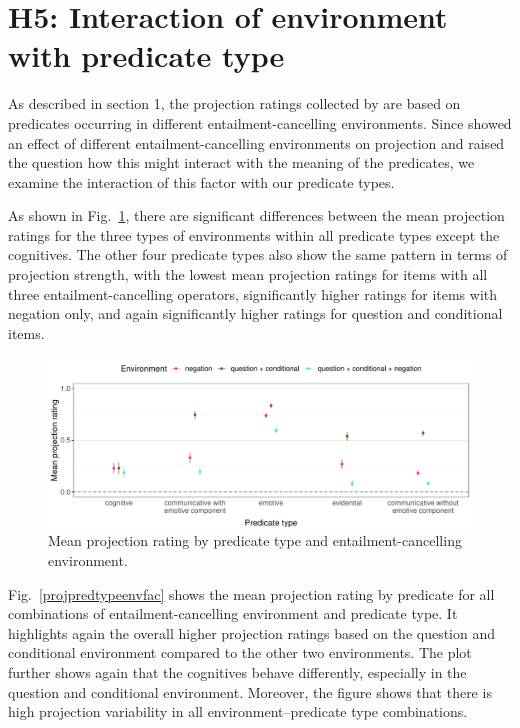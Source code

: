\documentclass[11pt,fleqn]{article}
\newcommand{\figref}[1]{Fig.~\ref{#1}}
\newcommand{\6}{\mbox{$[\hspace*{-.6mm}[$}}
\newcommand{\9}{\mbox{$]\hspace*{-.6mm}]$}}
\begin{document}
\section{H5: Interaction of environment with predicate type}

As described in section 1, the projection ratings collected by \cite{white-rawlins-nels2018} are based on predicates occurring in different entailment-cancelling environments. Since \cite{hofmann-etal23} showed an effect of different entailment-cancelling environments on projection and raised the question how this might interact with the meaning of the predicates, we examine the interaction of this factor with our predicate types. 

As shown in \figref{projpredtypeenv}, there are significant differences between the mean projection ratings for the three types of environments within all predicate types except the cognitives. The other four predicate types also show the same pattern in terms of projection strength, with the lowest mean projection ratings for items with all three entailment-cancelling operators, significantly higher ratings for items with negation only, and again significantly higher ratings for question and conditional items.

\begin{figure}[H]
	\centering
	\includegraphics[width=1\textwidth]{projection-by-predicateType-and-environment}
	\caption{Mean projection rating by predicate type and entailment-cancelling environment.}
	\label{projpredtypeenv}
\end{figure}

\figref{projpredtypeenvfac} shows the mean projection rating by predicate for all combinations of entailment-cancelling environment and predicate type. It highlights again the overall higher projection ratings based on the question and conditional environment compared to the other two environments. The plot further shows again that the cognitives behave differently, especially in the question and conditional environment. Moreover, the figure shows that there is high projection variability in all environment--predicate type combinations.
\end{document}
